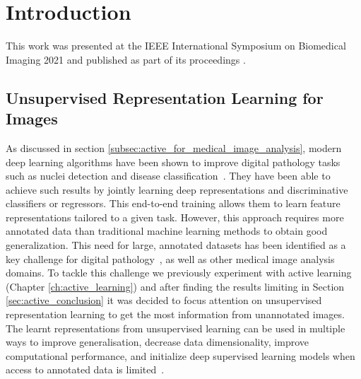 \section{Introduction}
\label{sec:unsupervised_intro}
This work was presented at the IEEE International Symposium on Biomedical Imaging 2021 and published as part of its proceedings \citep{carse2021unsupervised}.

\subsection{Unsupervised Representation Learning for Images}
\label{subsec:unsupervised_for_medical}
As discussed in section \ref{subsec:active_for_medical_image_analysis}, modern deep learning algorithms have been shown to improve digital pathology tasks such as nuclei detection and disease classification~\citep{litjens2017survey}. They have been able to achieve such results by jointly learning deep representations and discriminative classifiers or regressors. This end-to-end training allows them to learn feature representations tailored to a given task. However, this approach requires more annotated data than traditional machine learning methods to obtain good generalization. This need for large, annotated datasets has been identified as a key challenge for digital pathology~\citep{madabhushi2016image}, as well as other medical image analysis domains. To tackle this challenge we previously experiment with active learning (Chapter \ref{ch:active_learning}) and after finding the results limiting in Section \ref{sec:active_conclusion} it was decided to focus attention on unsupervised representation learning to get the most information from unannotated images. The learnt representations from unsupervised learning can be used in multiple ways to improve generalisation, decrease data dimensionality, improve computational performance, and initialize deep supervised learning models when access to annotated data is limited~\citep{bengio2013representation}.

